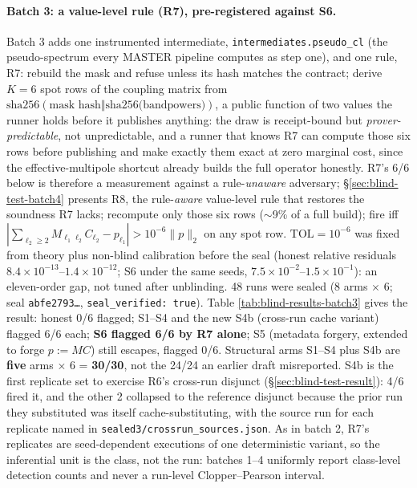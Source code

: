 \documentclass[11pt]{article}
\begin{document}
\paragraph{Batch 3: a value-level rule (R7), pre-registered against S6.}
\label{sec:blind-test-batch3}
Batch 3 adds one instrumented intermediate, \texttt{intermediates.pseudo\_cl}
(the pseudo-spectrum every MASTER pipeline computes as step one), and one
rule, R7: rebuild the mask and refuse unless its hash matches the contract;
derive \(K=6\) spot rows of the coupling matrix from
\(\mathrm{sha256}(\text{mask hash} \Vert \text{sha256(bandpowers)})\), a
public function of two values the runner holds before it publishes
anything: the draw is receipt-bound but \emph{prover-predictable}, not
unpredictable, and a runner that knows R7 can compute those six rows before
publishing and make exactly them exact at zero marginal cost, since the
effective-multipole shortcut already builds the full operator honestly.
R7's 6/6 below is therefore a measurement against a rule-\emph{unaware}
adversary; \S\ref{sec:blind-test-batch4} presents R8, the rule-\emph{aware}
value-level rule that restores the soundness R7 lacks;
recompute only those six rows (\(\sim\)9\% of a full build); fire iff
\(|\sum_{\ell_2\ge2} M_{\ell_1\ell_2} C_{\ell_2} - p_{\ell_1}| >
10^{-6}\lVert p\rVert_2\) on any spot row. \(\mathrm{TOL}=10^{-6}\) was fixed
from theory plus non-blind calibration before the seal (honest relative
residuals \(8.4\times10^{-13}\)--\(1.4\times10^{-12}\); S6 under the same
seeds, \(7.5\times10^{-2}\)--\(1.5\times10^{-1}\)): an eleven-order gap, not
tuned after unblinding. 48 runs were sealed (8 arms \(\times\) 6; seal
\texttt{abfe2793\ldots}, \texttt{seal\_verified: true}). Table
\ref{tab:blind-results-batch3} gives the result: honest 0/6 flagged;
S1--S4 and the new S4b (cross-run cache variant) flagged 6/6 each; \textbf{S6
flagged 6/6 by
R7 alone}; S5 (metadata forgery, extended to forge \(p := MC\)) still
escapes, flagged 0/6. Structural arms S1--S4 plus S4b are \textbf{five} arms
\(\times\) 6 = \textbf{30/30}, not the 24/24 an earlier draft misreported.
S4b is the first replicate set to exercise R6's cross-run disjunct
(\S\ref{sec:blind-test-result}): 4/6 fired it, and the other 2 collapsed to
the reference disjunct because the prior run they substituted was itself
cache-substituting, with the source run for each replicate named in
\texttt{sealed3/crossrun\_sources.json}. As in batch 2, R7's replicates are
seed-dependent executions of one deterministic variant, so the inferential
unit is the class, not the run: batches 1--4 uniformly report class-level
detection counts and never a run-level Clopper--Pearson interval.
\end{document}
